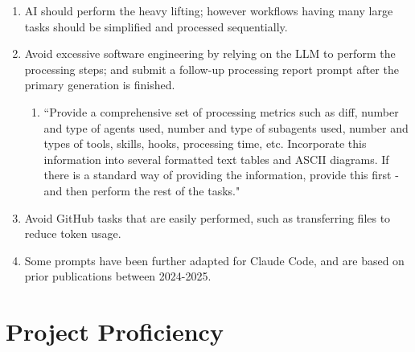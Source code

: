 \documentclass{article}
\begin{document}
\begin{enumerate}
\begin{enumerate}
    \item “Provide three ASCII diagrams, each with their own perspective, for each commit."
\end{enumerate}
\item AI should perform the heavy lifting; however workflows having many large tasks should be simplified and processed sequentially. 
\item Avoid excessive software engineering by relying on the LLM to perform the processing steps; and submit a follow-up processing report prompt after the primary generation is finished.
\begin{enumerate}
    \item “Provide a comprehensive set of processing metrics such as diff, number and type of agents used, number and type of subagents used, number and types of tools, skills, hooks, processing time, etc. Incorporate this information into several formatted text tables and ASCII diagrams. If there is a standard way of providing the information, provide this first - and then perform the rest of the tasks."
\end{enumerate}
\item Avoid GitHub tasks that are easily performed, such as transferring files to reduce token usage.
\item Some prompts have been further adapted for Claude Code, and are based on prior publications between 2024-2025. \cite{kawchak20}
\end{enumerate}





\section{Project Proficiency}
\end{document}
